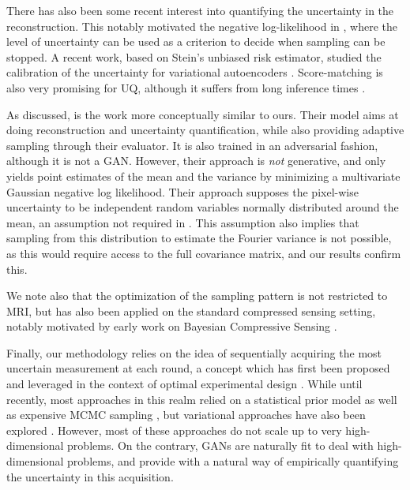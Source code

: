 There has also been some recent interest into quantifying the uncertainty in the reconstruction. This notably motivated the negative log-likelihood in \citet{zhang2019reducing}, where the level of uncertainty can be used as a criterion to decide when sampling can be stopped. A recent work, based on Stein's unbiased risk estimator, studied the calibration of the uncertainty for variational autoencoders \citep{edupuganti_uncertainty_2020}. Score-matching is also very promising for UQ, although it suffers from long inference times \citep{ramzi2020denoising,song2021solving}.

As discussed, \citet{zhang2019reducing} is the work more conceptually similar to ours. %
Their model aims at doing reconstruction and uncertainty quantification, while also providing adaptive sampling through their evaluator. It is also trained in an adversarial fashion, although it is not a GAN. However, their approach is \textit{not} generative, and only yields point estimates of the mean and the variance by minimizing a multivariate Gaussian negative log likelihood. Their approach supposes the pixel-wise uncertainty to be independent random variables normally distributed around the mean, an assumption not required in \citet{adler2018deep, belghazi2019learning}. This assumption also implies that sampling from this distribution to estimate the Fourier variance is not possible, as this would require access to the full covariance matrix, and our results confirm this. 

We note also that the optimization of the sampling pattern is not restricted to MRI, but has also been applied on the standard compressed sensing setting, notably motivated by early work on Bayesian Compressive Sensing \citep{ji2008bayesian,wu2019deep,wu2019learning}. 

Finally, our methodology relies on the idea of sequentially acquiring the most uncertain measurement at each round, a concept which has first been proposed and leveraged in the context of optimal experimental design \citep{lindley1956measure, chaloner1995bayesian, vanlier2012bayesian}. While until recently, most approaches in this realm relied on a statistical prior model as well as expensive MCMC sampling \citep{vanlier2012bayesian,pauwels2014bayesian}, but variational approaches have also been explored \citep{foster2019variational}. However, most of these approaches do not scale up to very high-dimensional problems. On the contrary, GANs are naturally fit to deal with high-dimensional problems, and provide with a natural way of empirically quantifying the uncertainty in this acquisition.  

